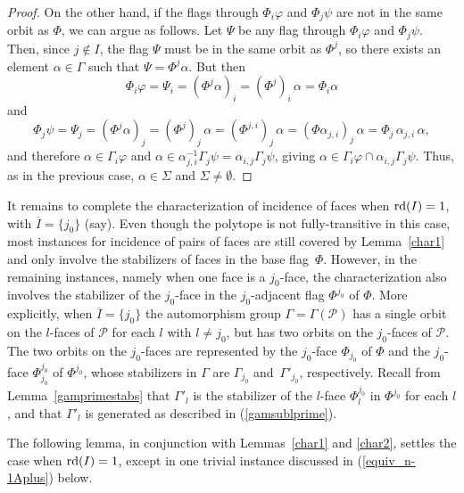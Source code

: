 \documentclass[12pt]{article}
\renewcommand{\phi}{\varphi}
\renewcommand{\bar}{\overline}
\renewcommand{\>}{\rangle}
\theoremstyle{definition}\newtheorem{definition}{Definition}[section]
\begin{document}
\begin{proof}
On the other hand, if the flags through $\Phi_i\phi$ and $\Phi_j\psi$ are not in the same orbit as $\Phi$, we can argue as follows. Let $\Psi$ be any flag through $\Phi_i\phi$ and $\Phi_j\psi$. Then, since $j \notin I$, the flag $\Psi$ must be in the same orbit as $\Phi^j$, so there exists an element $\alpha \in \Gamma$ such that $\Psi=\Phi^j \alpha$. But then 
\[\Phi_{i}\phi=\Psi_{i}=(\Phi^j\alpha)_{i}=(\Phi^j)_{i}\,\alpha=\Phi_{i}\alpha\]
and
\[\Phi_{j}\psi =\Psi_{j} = (\Phi^{j}\alpha)_{j} =(\Phi^{j})_{j}\, \alpha = (\Phi^{j, i})_{j}\, \alpha =(\Phi \alpha_{j,i})_{j}\, \alpha =\Phi_{j}\,\alpha_{j,i} \,\alpha ,\]
and therefore $\alpha \in \Gamma_i\phi$ and $\alpha \in \alpha_{j,i}^{-1}\Gamma_{j}\psi = \alpha_{i,j}\Gamma_{j}\psi$, giving $\alpha\in\Gamma_i\phi \cap \alpha_{i,j}\Gamma_j \psi$. Thus, as in the previous case, $\alpha\in\Sigma$ and $\Sigma\neq \emptyset$.
\end{proof}
\medskip

It remains to complete the characterization of incidence of faces when ${\rm rd}(I)=1$, with $\bar{I}=\{j_0\}$ (say). Even though the polytope is not fully-transitive in this case, most instances for incidence of pairs of faces are still covered by Lemma~\ref{char1} and only involve the stabilizers of faces in the base flag~$\Phi$. However, in the remaining instances, namely when one face is a $j_0$-face, the characterization also involves the stabilizer of the $j_0$-face in the $j_0$-adjacent flag $\Phi^{j_0}$ of $\Phi$. More explicitly, when $\bar{I}=\{j_0\}$ the automorphism group $\Gamma=\Gamma(\mathcal{P})$ has a single orbit on the $l$-faces of $\mathcal{P}$ for each $l$ with $l \neq j_0$, but has two orbits on the $j_0$-faces of $\mathcal{P}$. The two orbits on the $j_0$-faces are represented by the $j_0$-face $\Phi_{j_0}$ of $\Phi$ and the $j_0$-face $\Phi^{j_0}_{j_0}$ of $\Phi^{j_0}$, whose stabilizers in $\Gamma$ are $\Gamma_{j_{0}}$ and~$\Gamma'_{j_{0}}$, respectively. Recall from Lemma~\ref{gamprimestabs} that $\Gamma'_{l}$ is the stabilizer of the $l$-face $\Phi_{l}^{j_0}$ in $\Phi^{j_0}$ for each $l$, and that $\Gamma'_{l}$ is generated as described in (\ref{gamsublprime}). 
\smallskip

The following lemma, in conjunction with Lemmas~\ref{char1} and \ref{char2}, settles the case when ${\rm rd}(I)=1$, except in one trivial instance discussed in (\ref{equiv_n-1Aplus}) below.
\end{document}
